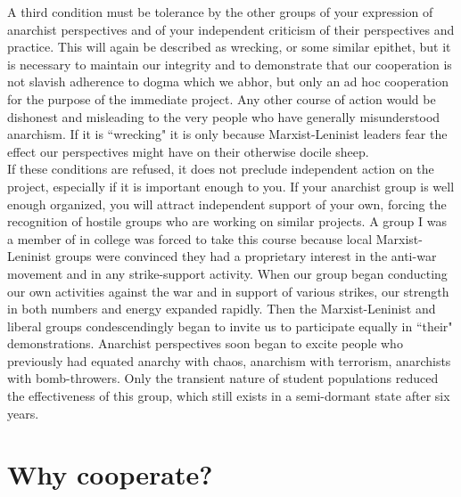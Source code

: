 A third condition must be tolerance by the other groups of your expression of anarchist perspectives and of your independent criticism of their perspectives and practice. This will again be described as wrecking, or some similar epithet, but it is necessary to maintain our integrity and to demonstrate that our cooperation is not slavish adherence to dogma which we abhor, but only an ad hoc cooperation for the purpose of the immediate project. Any other course of action would be dishonest and misleading to the very people who have generally misunderstood anarchism. If it is ``wrecking" it is only because Marxist-Leninist leaders fear the effect our perspectives might have on their otherwise docile sheep.\\
If these conditions are refused, it does not preclude independent action on the project, especially if it is important enough to you. If your anarchist group is well enough organized, you will attract independent support of your own, forcing the recognition of hostile groups who are working on similar projects. A group I was a member of in college was forced to take this course because local Marxist-Leninist groups were convinced they had a proprietary interest in the anti-war movement and in any strike-support activity. When our group began conducting our own activities against the war and  in support of various strikes, our strength in both numbers and energy expanded rapidly. Then the Marxist-Leninist and liberal groups condescendingly began to invite us to participate equally in ``their" demonstrations. Anarchist perspectives soon began to excite people who previously had equated anarchy with chaos, anarchism with terrorism, anarchists with bomb-throwers. Only the transient nature of student populations reduced the effectiveness of this group, which still exists in a semi-dormant state after six years.

\section*{Why cooperate?}

